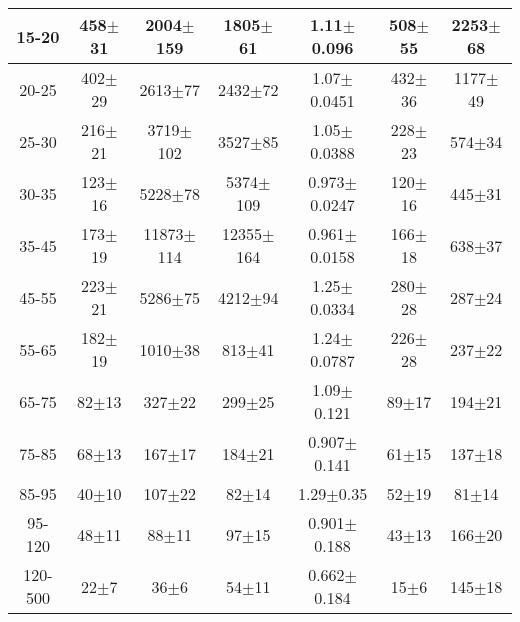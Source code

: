 \begin{table}[h]
\begin{center}
\begin{tabular}{|c|c|c|c|c|c|c|}
15-20 & 458$\pm$31 & 2004$\pm$159 & 1805$\pm$61 & 1.11$\pm$0.096& 508$\pm$55& 2253$\pm$68 \\ \hline
20-25 & 402$\pm$29 & 2613$\pm$77 & 2432$\pm$72 & 1.07$\pm$0.0451& 432$\pm$36& 1177$\pm$49 \\ \hline
25-30 & 216$\pm$21 & 3719$\pm$102 & 3527$\pm$85 & 1.05$\pm$0.0388& 228$\pm$23& 574$\pm$34 \\ \hline
30-35 & 123$\pm$16 & 5228$\pm$78 & 5374$\pm$109 & 0.973$\pm$0.0247& 120$\pm$16& 445$\pm$31 \\ \hline
35-45 & 173$\pm$19 & 11873$\pm$114 & 12355$\pm$164 & 0.961$\pm$0.0158& 166$\pm$18& 638$\pm$37 \\ \hline
45-55 & 223$\pm$21 & 5286$\pm$75 & 4212$\pm$94 & 1.25$\pm$0.0334& 280$\pm$28& 287$\pm$24 \\ \hline
55-65 & 182$\pm$19 & 1010$\pm$38 & 813$\pm$41 & 1.24$\pm$0.0787& 226$\pm$28& 237$\pm$22 \\ \hline
65-75 & 82$\pm$13 & 327$\pm$22 & 299$\pm$25 & 1.09$\pm$0.121& 89$\pm$17& 194$\pm$21 \\ \hline
75-85 & 68$\pm$13 & 167$\pm$17 & 184$\pm$21 & 0.907$\pm$0.141& 61$\pm$15& 137$\pm$18 \\ \hline
85-95 & 40$\pm$10 & 107$\pm$22 & 82$\pm$14 & 1.29$\pm$0.35& 52$\pm$19& 81$\pm$14 \\ \hline
95-120 & 48$\pm$11 & 88$\pm$11 & 97$\pm$15 & 0.901$\pm$0.188& 43$\pm$13& 166$\pm$20 \\ \hline
120-500 & 22$\pm$7 & 36$\pm$6 & 54$\pm$11 & 0.662$\pm$0.184& 15$\pm$6& 145$\pm$18 \\ \hline
  \end{tabular}
  \label{tab:EtoGAMMA}
  \end{center}
\end{table}


